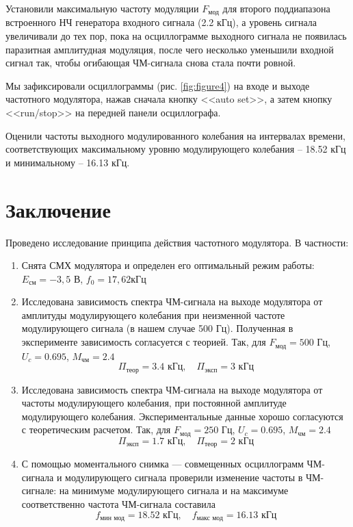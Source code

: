 \documentclass[a4paper,12pt]{article}
\begin{document}
Установили максимальную частоту модуляции $F_\text{мод}$ для второго поддиапазона встроенного НЧ генератора входного сигнала (2.2 кГц), а уровень сигнала увеличивали до тех пор, пока на осциллограмме выходного сигнала не появилась паразитная амплитудная модуляция, после чего несколько уменьшили входной сигнал так, чтобы огибающая ЧМ-сигнала снова стала почти ровной.

Мы зафиксировали осциллограммы (рис. \ref{fig:figure4}) на входе и выходе частотного модулятора, нажав сначала кнопку <<auto set>>, а затем кнопку <<run/stop>> на передней панели осциллографа. 

Оценили частоты выходного модулированного колебания на интервалах времени, соответствующих максимальному уровню модулирующего колебания -- 18.52 кГц и минимальному -- 16.13 кГц.


\section*{Заключение}
Проведено исследование принципа действия частотного модулятора. В частности:
\begin{enumerate}
	\item Снята СМХ модулятора и определен его оптимальный режим работы: $E_{\text{см}}=-3,5 {\text{ В}}$, $f_0=17,62 {\text{кГц}}$
	\item Исследована зависимость спектра ЧМ-сигнала на выходе модулятора от амплитуды модулирующего колебания при неизменной частоте модулирующего сигнала (в нашем случае 500 Гц). Полученная в эксперименте зависимость согласуется с теорией. Так, для $F_{\text{мод}}=500\text{ Гц}$, $U_c=0.695$, $M_{\text{чм}}=2.4$ 
\begin{equation}
	\Pi_\text{теор}=3.4 \text{ кГц}, \quad 
	\Pi_\text{эксп}=3 \text{ кГц}
\end{equation}
	\item  Исследована зависимость спектра ЧМ-сигнала на выходе модулятора от частоты модулирующего колебания, при постоянной амплитуде модулирующего колебания. Экспериментальные данные хорошо согласуются с теоретическим расчетом. Так, для $F_{\text{мод}}=250\text{ Гц}$, $U_c=0.695$, $M_{\text{чм}}=2.4$ 
\begin{equation} 
\Pi_\text{эксп}=1.7 \text{ кГц}, \quad \Pi_\text{теор}=2 \text{ кГц} 
\end{equation}
	\item С помощью моментального снимка — совмещенных осциллограмм ЧМ-сигнала и модулирующего сигнала проверили изменение частоты в ЧМ-сигнале: на минимуме модулирующего сигнала и на максимуме соответственно частота ЧМ-сигнала составила 
\begin{equation} 
f_\text{мин мод}=18.52\text{ кГц}, \quad 
f_\text{макс мод}=16.13\text{ кГц} 
\end{equation}
	
\end{enumerate}
\end{document}
